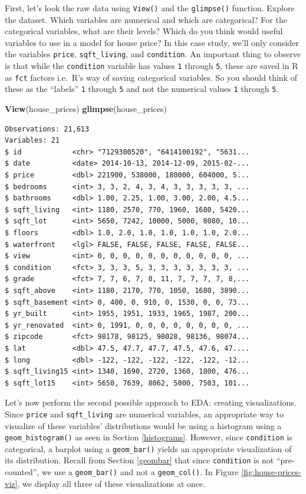 \documentclass[12pt, krantz2,]{krantz}
\makeatletter
\newenvironment{Shaded}{\begin{snugshade}}{\end{snugshade}}
\newcommand{\KeywordTok}[1]{\textcolor[rgb]{0.27,0.27,0.27}{\textbf{#1}}}
\newcommand{\NormalTok}[1]{#1}
\newenvironment{kframe}{%
\medskip{}
\setlength{\fboxsep}{.8em}
 \def\at@end@of@kframe{}%
 \ifinner\ifhmode%
  \def\at@end@of@kframe{\end{minipage}}%
  \begin{minipage}{\columnwidth}%
 \fi\fi%
 \def\FrameCommand##1{\hskip\@totalleftmargin \hskip-\fboxsep
 \colorbox{shadecolor}{##1}\hskip-\fboxsep
     \hskip-\linewidth \hskip-\@totalleftmargin \hskip\columnwidth}%
 \MakeFramed {\advance\hsize-\width
   \@totalleftmargin\z@ \linewidth\hsize
   \@setminipage}}%
 {\par\unskip\endMakeFramed%
 \at@end@of@kframe}
\renewenvironment{Shaded}{\begin{kframe}}{\end{kframe}}
\makeatother
\begin{document}
First, let's look the raw data using \texttt{View()} and the \texttt{glimpse()} function. Explore the dataset. Which variables are numerical and which are categorical? For the categorical variables, what are their levels? Which do you think would useful variables to use in a model for house price? In this case study, we'll only consider the variables \texttt{price}, \texttt{sqft\_living}, and \texttt{condition}. An important thing to observe is that while the \texttt{condition} variable has values \texttt{1} through \texttt{5}, these are saved in R as \texttt{fct} factors i.e.~R's way of saving categorical variables. So you should think of these as the ``labels'' \texttt{1} through \texttt{5} and not the numerical values \texttt{1} through \texttt{5}.

\begin{Shaded}
\begin{Highlighting}[]
\KeywordTok{View}\NormalTok{(house_prices)}
\KeywordTok{glimpse}\NormalTok{(house_prices)}
\end{Highlighting}
\end{Shaded}

\begin{verbatim}
Observations: 21,613
Variables: 21
$ id            <chr> "7129300520", "6414100192", "5631...
$ date          <date> 2014-10-13, 2014-12-09, 2015-02-...
$ price         <dbl> 221900, 538000, 180000, 604000, 5...
$ bedrooms      <int> 3, 3, 2, 4, 3, 4, 3, 3, 3, 3, 3, ...
$ bathrooms     <dbl> 1.00, 2.25, 1.00, 3.00, 2.00, 4.5...
$ sqft_living   <int> 1180, 2570, 770, 1960, 1680, 5420...
$ sqft_lot      <int> 5650, 7242, 10000, 5000, 8080, 10...
$ floors        <dbl> 1.0, 2.0, 1.0, 1.0, 1.0, 1.0, 2.0...
$ waterfront    <lgl> FALSE, FALSE, FALSE, FALSE, FALSE...
$ view          <int> 0, 0, 0, 0, 0, 0, 0, 0, 0, 0, 0, ...
$ condition     <fct> 3, 3, 3, 5, 3, 3, 3, 3, 3, 3, 3, ...
$ grade         <fct> 7, 7, 6, 7, 8, 11, 7, 7, 7, 7, 8,...
$ sqft_above    <int> 1180, 2170, 770, 1050, 1680, 3890...
$ sqft_basement <int> 0, 400, 0, 910, 0, 1530, 0, 0, 73...
$ yr_built      <int> 1955, 1951, 1933, 1965, 1987, 200...
$ yr_renovated  <int> 0, 1991, 0, 0, 0, 0, 0, 0, 0, 0, ...
$ zipcode       <fct> 98178, 98125, 98028, 98136, 98074...
$ lat           <dbl> 47.5, 47.7, 47.7, 47.5, 47.6, 47....
$ long          <dbl> -122, -122, -122, -122, -122, -12...
$ sqft_living15 <int> 1340, 1690, 2720, 1360, 1800, 476...
$ sqft_lot15    <int> 5650, 7639, 8062, 5000, 7503, 101...
\end{verbatim}

Let's now perform the second possible approach to EDA: creating visualizations. Since \texttt{price} and \texttt{sqft\_living} are numerical variables, an appropriate way to visualize of these variables' distributions would be using a histogram using a \texttt{geom\_histogram()} as seen in Section \ref{histograms}. However, since \texttt{condition} is categorical, a barplot using a \texttt{geom\_bar()} yields an appropriate visualization of its distribution. Recall from Section \ref{geombar} that since \texttt{condition} is not ``pre-counted'', we use a \texttt{geom\_bar()} and not a \texttt{geom\_col()}. In Figure \ref{fig:house-prices-viz}, we display all three of these visualizations at once.
\end{document}

